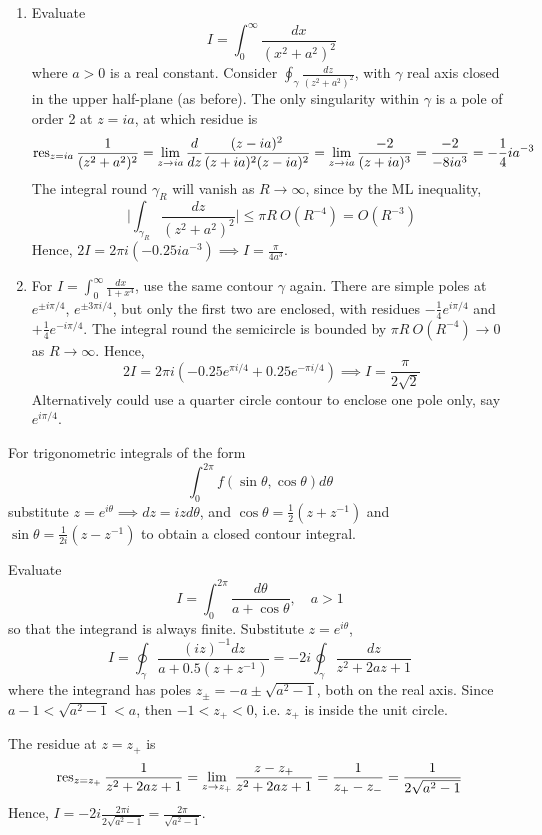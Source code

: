 \documentclass[a4paper]{article}
\begin{document}
\begin{eg}\leavevmode
\begin{enumerate}
    \item Evaluate
    $$I=\int_0^\infty\frac{dx}{(x^2+a^2)^2}$$
    where $a>0$ is a real constant. Consider $\oint_\gamma\frac{dz}{(z^2+a^2)^2}$, with $\gamma$ real axis closed in the upper half-plane (as before). The only singularity within $\gamma$ is a pole of order 2 at $z=ia$, at which residue is
    $$\operatorname{res}_{z=ia}\frac{1}{(z^2+a^2)^2}=\lim_{z\rightarrow ia}\frac{d}{dz}\frac{(z-ia)^2}{(z+ia)^2(z-ia)^2}=\lim_{z\rightarrow ia}\frac{-2}{(z+ia)^3}=\frac{-2}{-8ia^3}=-\frac{1}{4}ia^{-3}$$
    The integral round $\gamma_R$ will vanish as $R\rightarrow\infty$, since by the ML inequality,
    $$\bigg|\int_{\gamma_R}\frac{dz}{(z^2+a^2)^2}\bigg|\leq\pi R ~O(R^{-4})=O(R^{-3})$$
    Hence, $2I=2\pi i(-0.25 ia^{-3})\implies I=\frac{\pi}{4a^3}$.
    \item For $I=\int_0^\infty\frac{dx}{1+x^4}$, use the same contour $\gamma$ again. There are simple poles at $e^{\pm i\pi/4}$, $e^{\pm 3\pi i/4}$, but only the first two are enclosed, with residues $-\frac{1}{4}e^{i\pi/4}$ and $+\frac{1}{4}e^{-i\pi/4}$. The integral round the semicircle is bounded by $\pi R~O(R^{-4})\rightarrow 0$ as $R\rightarrow\infty$. Hence,
    $$2I=2\pi i(-0.25e^{\pi i/4}+0.25e^{-\pi i/4})\implies I=\frac{\pi}{2\sqrt{2}}$$
    Alternatively could use a quarter circle contour to enclose one pole only, say $e^{i\pi/4}$.
\end{enumerate}
\end{eg}
For trigonometric integrals of the form
$$\int_0^{2\pi}f(\sin\theta,\cos\theta)d\theta$$
substitute $z=e^{i\theta}\implies dz=izd\theta$, and $\cos\theta=\frac{1}{2}(z+z^{-1})$ and $\sin\theta=\frac{1}{2i}(z-z^{-1})$ to obtain a closed contour integral. 
\begin{eg}
Evaluate
$$I=\int_0^{2\pi}\frac{d\theta}{a+\cos\theta},\quad a>1$$
so that the integrand is always finite. Substitute $z=e^{i\theta}$,
$$I=\oint_{\gamma}\frac{(iz)^{-1}dz}{a+0.5(z+z^{-1})}=-2i\oint_\gamma\frac{dz}{z^2+2az+1}$$
where the integrand has poles $z_\pm=-a\pm\sqrt{a^2-1}$, both on the real axis. Since $a-1<\sqrt{a^2-1}<a$, then $-1<z_+<0$, i.e. $z_+$ is inside the unit circle. 
 \begin{center}
  \end{center}

The residue at $z=z_+$ is
$$\operatorname{res}_{z=z_+}\frac{1}{z^2+2az+1}=\lim_{z\rightarrow z_+}\frac{z-z_+}{z^2+2az+1}=\frac{1}{z_+-z_-}=\frac{1}{2\sqrt{a^2-1}}$$
Hence, $I=-2i\frac{2\pi i}{2\sqrt{a^2-1}}=\frac{2\pi}{\sqrt{a^2-1}}$.
\end{eg}
\end{document}
